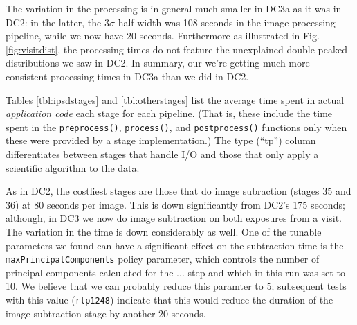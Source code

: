 The variation in the processing is in general much smaller in DC3a as
it was in DC2: in the latter, the $3\sigma$ half-width was 108
seconds in the image processing pipeline, while we now have 20
seconds.  Furthermore as illustrated in Fig. \ref{fig:visitdist}, the
processing times do not feature the unexplained double-peaked
distributions we saw in DC2.  In summary, our we're getting much more
consistent processing times in DC3a than we did in DC2.  

Tables \ref{tbl:ipsdstages} and \ref{tbl:otherstages} list the average
time spent in actual {\it application code} each stage for each pipeline.
(That is, these include the time spent in the {\tt preprocess()}, 
{\tt process()}, and {\tt postprocess()} functions only when these
were provided by a stage implementation.)  The type (``tp'') column
differentiates between stages that handle I/O and those that only
apply a scientific algorithm to the data.  

As in DC2, the costliest stages are those that do image subraction
(stages 35 and 36) at 80 seconds per image.  This is down
significantly from DC2's 175 seconds; although, in DC3 we now do image
subtraction on both exposures from a visit.  The variation in the time
is down considerably as well.  One of the tunable parameters we found
can have a significant effect on the subtraction time is the 
{\tt maxPrincipalComponents} policy parameter, which controls the number
of principal components calculated for the ... step and which in this
run was set to 10.  We believe that we can probably reduce this
paramter to 5; subsequent tests with this value ({\tt rlp1248})
indicate that this would reduce the duration of the image subtraction
stage by another 20 seconds.

